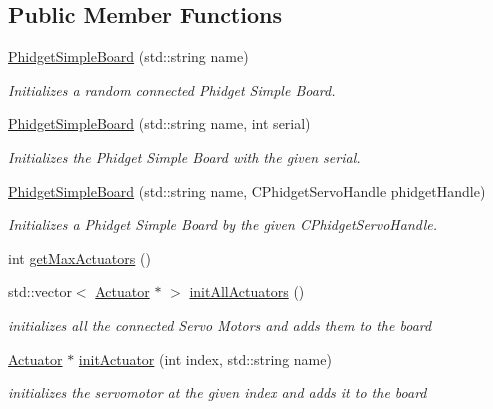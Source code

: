 \subsection*{Public Member Functions}
\begin{DoxyCompactItemize}
\item 
\hyperlink{classdrobot_1_1device_1_1actuator_1_1PhidgetSimpleBoard_a750faa2124c350c91a114d18e2cc2300}{Phidget\-Simple\-Board} (std\-::string name)
\begin{DoxyCompactList}\small\item\em Initializes a random connected Phidget Simple Board. \end{DoxyCompactList}\item 
\hyperlink{classdrobot_1_1device_1_1actuator_1_1PhidgetSimpleBoard_a24a16a968ecc6e7025b6a0e8089ce694}{Phidget\-Simple\-Board} (std\-::string name, int serial)
\begin{DoxyCompactList}\small\item\em Initializes the Phidget Simple Board with the given serial. \end{DoxyCompactList}\item 
\hyperlink{classdrobot_1_1device_1_1actuator_1_1PhidgetSimpleBoard_a3d30fd69c7dc2030a13e128b020e2ce1}{Phidget\-Simple\-Board} (std\-::string name, C\-Phidget\-Servo\-Handle phidget\-Handle)
\begin{DoxyCompactList}\small\item\em Initializes a Phidget Simple Board by the given C\-Phidget\-Servo\-Handle. \end{DoxyCompactList}\item 
int \hyperlink{classdrobot_1_1device_1_1actuator_1_1PhidgetSimpleBoard_ae7472942d639115a395f0ae95e331c47}{get\-Max\-Actuators} ()
\item 
std\-::vector$<$ \hyperlink{classdrobot_1_1device_1_1actuator_1_1Actuator}{Actuator} $\ast$ $>$ \hyperlink{classdrobot_1_1device_1_1actuator_1_1PhidgetSimpleBoard_a1d13867a272da7219da6892f5564c97c}{init\-All\-Actuators} ()
\begin{DoxyCompactList}\small\item\em initializes all the connected Servo Motors and adds them to the board \end{DoxyCompactList}\item 
\hyperlink{classdrobot_1_1device_1_1actuator_1_1Actuator}{Actuator} $\ast$ \hyperlink{classdrobot_1_1device_1_1actuator_1_1PhidgetSimpleBoard_ac3543031be94ce9a6e245a2a73f704f5}{init\-Actuator} (int index, std\-::string name)
\begin{DoxyCompactList}\small\item\em initializes the servomotor at the given index and adds it to the board \end{DoxyCompactList}\item 

\end{DoxyCompactItemize}
